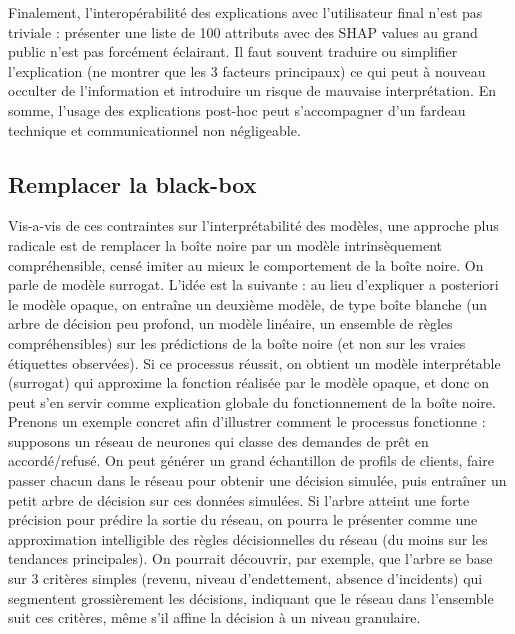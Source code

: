 \documentclass{article}
\begin{document}
    Finalement, l’interopérabilité des explications avec l’utilisateur final n’est pas triviale : présenter une liste de 100 attributs avec des SHAP values au grand public n’est pas forcément éclairant. Il faut souvent traduire ou simplifier l’explication (ne montrer que les 3 facteurs principaux) ce qui peut à nouveau occulter de l’information et introduire un risque de mauvaise interprétation. En somme, l’usage des explications post-hoc peut s’accompagner d’un fardeau technique et communicationnel non négligeable.

\subsection{Remplacer la black-box}

\quad Vis-a-vis de ces contraintes sur l'interprétabilité des modèles, une approche plus radicale est de remplacer la boîte noire par un modèle intrinsèquement compréhensible, censé imiter au mieux le comportement de la boîte noire. On parle de modèle surrogat. L’idée est la suivante : au lieu d’expliquer a posteriori le modèle opaque, on entraîne un deuxième modèle, de type boîte blanche (un arbre de décision peu profond, un modèle linéaire, un ensemble de règles compréhensibles) sur les prédictions de la boîte noire (et non sur les vraies étiquettes observées). Si ce processus réussit, on obtient un modèle interprétable (surrogat) qui approxime la fonction réalisée par le modèle opaque, et donc on peut s’en servir comme explication globale du fonctionnement de la boîte noire.\\

Prenons un exemple concret afin d’illustrer comment le processus fonctionne : supposons un réseau de neurones qui classe des demandes de prêt en accordé/refusé. On peut générer un grand échantillon de profils de clients, faire passer chacun dans le réseau pour obtenir une décision simulée, puis entraîner un petit arbre de décision sur ces données simulées. Si l’arbre atteint une forte précision pour prédire la sortie du réseau, on pourra le présenter comme une approximation intelligible des règles décisionnelles du réseau (du moins sur les tendances principales). On pourrait découvrir, par exemple, que l’arbre se base sur 3 critères simples (revenu, niveau d’endettement, absence d’incidents) qui segmentent grossièrement les décisions, indiquant que le réseau dans l’ensemble suit ces critères, même s’il affine la décision à un niveau granulaire.\\
\end{document}
